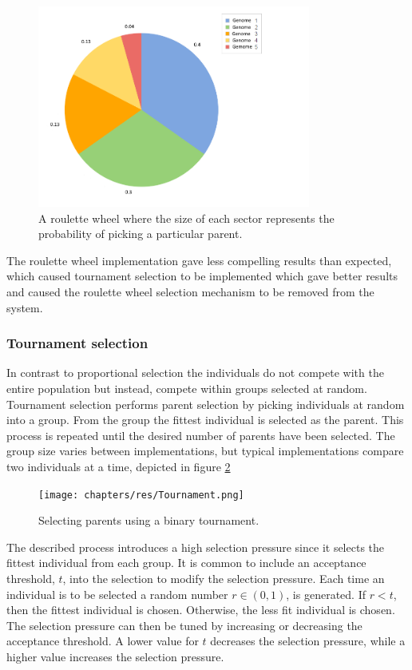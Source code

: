 \begin{figure}[H]
	\centering
	\includegraphics[width=0.80\textwidth, clip]{chapters/res/roulette.png}
	\caption{A roulette wheel where the size of each sector represents the probability of picking a particular parent.}
	\label{fig:roulette}
\end{figure}

The roulette wheel implementation gave less compelling results than expected, which caused tournament selection to be implemented which gave better results and caused the roulette wheel selection mechanism to be removed from the system.		
\subsubsection{Tournament selection}
In contrast to proportional selection the individuals do not compete with the entire population but instead, compete within groups selected at random.
Tournament selection performs parent selection by picking individuals at random into a group.
From the group the fittest individual is selected as the parent.
This process is repeated until the desired number of parents have been selected.
The group size varies between implementations, but typical implementations compare two\cite{goh_sexual_2003} individuals at a time, depicted in figure \ref{fig:tournament}

\begin{figure}[H]    
	\centering
	\texttt{[image: chapters/res/Tournament.png]}
	\caption{Selecting parents using a binary tournament.}
	\label{fig:tournament}
\end{figure}

The described process introduces a high selection pressure since it selects the fittest individual from each group.
It is common to include an acceptance threshold, $t$, into the selection to modify the selection pressure\cite{goh_sexual_2003}.
Each time an individual is to be selected a random number $r \in (0, 1)$, is generated.
If $r < t$, then the fittest individual is chosen. 
Otherwise, the less fit individual is chosen. 
The selection pressure can then be tuned by increasing or decreasing the acceptance threshold. 
A lower value for $t$ decreases the selection pressure, while a higher value increases the selection pressure.

